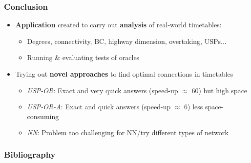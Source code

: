 \documentclass[]{beamer}
\begin{document}
        \begin{frame}
            \frametitle{Conclusion}
            \begin{itemize}
				\item \textbf{Application} created to carry out \textbf{analysis} of real-world timetables:
				\begin{itemize}
					\item Degrees, connectivity, BC, highway dimension, overtaking, USPs...
					\item Running \& evaluating tests of oracles
				\end{itemize}
				\item<2-> Trying out \textbf{novel approaches} to find optimal connections in timetables
				\begin{itemize}
					\item \textit{USP-OR}: Exact and very quick answers (speed-up $\approx$ 60) but high space
					\item \textit{USP-OR-A}: Exact and quick answers (speed-up $\approx$ 6) less space-consuming
					\item \textit{NN}: Problem too challenging for NN/try different types of network
				\end{itemize}
			\end{itemize}
        \end{frame}
        
    \begin{frame}[allowframebreaks]
        \frametitle{Bibliography}
        \tiny
        
        
    \end{frame}
\end{document}
